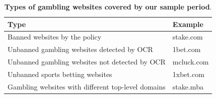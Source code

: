 \documentclass[a4paper,12pt]{article}
\begin{document}
\begin{table}[!htb]
\centering
\renewcommand{\arraystretch}{1.2}
\begin{threeparttable}
\begin{tabular}{ll}
\hline 
Type & Example\\
\midrule
Banned websites by the policy & stake.com \\
Unbanned gambling websites detected by OCR & 1bet.com \\
Unbanned gambling websites not detected by OCR & mcluck.com \\
Unbanned sports betting websites & 1xbet.com\\
Gambling websites with different top-level domains & stake.mba\\
\hline 
\end{tabular}
\end{threeparttable}
\caption{\textbf{Types of gambling websites covered by our sample period}.}
\label{table:traffic-websites}
\end{table}

\end{document}
